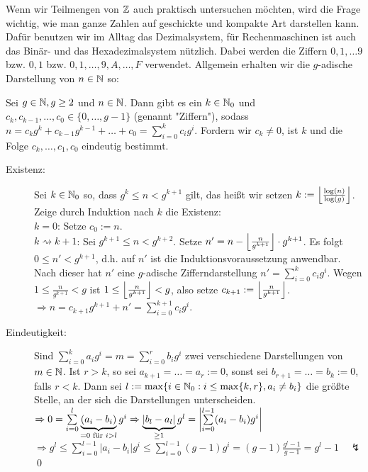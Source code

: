 Wenn wir Teilmengen von $\ZZ$ auch praktisch untersuchen möchten, wird die Frage wichtig, wie man ganze Zahlen auf geschickte und kompakte Art darstellen kann. Dafür benutzen wir im Alltag das Dezimalsystem, für Rechenmaschinen ist auch das Binär- und das Hexadezimalsystem nützlich. Dabei werden die Ziffern $0,1,\dots 9$ bzw. $0,1$ bzw. $0,1,\dots, 9, A, \dots, F$ verwendet. Allgemein erhalten wir die $g$-adische Darstellung von $n \in \NN$ so:

\begin{satz}
\label{satz_g-adisch}
	Sei $g \in \NN, g \geq 2$ und $n \in \NN$. Dann gibt es ein $k \in \NN_0$ und $c_k, c_{k-1}, \dots, c_0 \in \{0, \dots, g-1\}$ (genannt "Ziffern"), sodass $n = c_k g^k + c_{k-1} g^{k-1} + \dots + c_0 = \sum_{i=0}^k c_i g^i$. Fordern wir $c_k \neq 0$, ist $k$ und die Folge $c_k, \dots, c_1, c_0$ eindeutig bestimmt.
\end{satz}

	\begin{description}
	\item[Existenz:] Sei $k \in \NN_0$ so, dass $g^k \leq n < g^{k+1}$ gilt, das heißt wir setzen $k := \floor*{\frac{\log(n)}{\log(g)}}$. Zeige durch Induktion nach $k$ die Existenz: \\
	$k = 0$: Setze $c_0 := n$. \\
	$k \rightsquigarrow k+1$: Sei $g^{k+1} \leq n < g^{k+2}$. Setze $n' = n - \floor*{\frac{n}{g^{k+1}}} \cdot g^{k+1}$. Es folgt $0 \leq n' < g^{k+1}$, d.h. auf $n'$ ist die Induktionsvoraussetzung anwendbar. Nach dieser hat $n'$ eine $g$-adische Zifferndarstellung $n' = \sum\limits_{i=0}^{k} c_i g^i$. Wegen $1 \leq  \frac{n}{g^{k+1}} < g$ ist $1 \leq \floor*{\frac{n}{g^{k+1}}} < g$, also setze $c_{k+1} := \floor*{\frac{n}{g^{k+1}}}$. \\
	$\Rightarrow  n = c_{k+1} g^{k+1} + n' = \sum\limits_{i=0}^{k+1} c_i g^i$.
	\item[Eindeutigkeit:] Sind $\sum\limits_{i=0}^{k} a_i g^i = m = \sum\limits_{i=0}^{r} b_i g^i$ zwei verschiedene Darstellungen von $m \in \NN$. Ist $r > k$, so sei $a_{k+1} = \dots = a_r := 0$, sonst sei $b_{r+1} = \dots = b_k := 0$, falls $r < k$. Dann sei $l := \max \{i \in \NN_0 : i \leq \max\{k,r\}, a_i \neq b_i \}$ die größte Stelle, an der sich die Darstellungen unterscheiden. \\
	$\Rightarrow 0 = \sum\limits_{i=0}^l \underbrace{(a_i-b_i)}_{=0 \text{ für } i>l} g^i \Rightarrow \underbrace{|b_l - a_l|}_{\geq 1} g^l = \abs*{\sum\limits_{i=0}^{l-1} (a_i - b_i)g^i}$ \\
	$\Rightarrow g^l \leq \sum\limits_{i=0}^{l-1} |a_i-b_i| g^i \leq \sum\limits_{i=0}^{l-1} (g-1) g^i = (g-1) \frac{g^l - 1}{g-1} = g^l - 1 \quad \lightning$ \qed
	\end{description}


